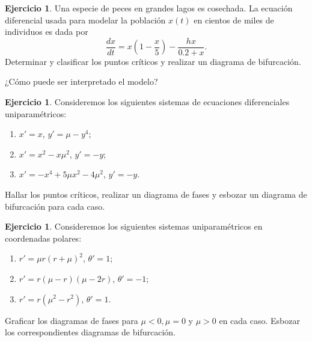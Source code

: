 \documentclass[12pt, a4paper]{amsbook}
\theoremstyle{remark}
\theoremstyle{definition}
\newtheorem{ejer}[teo]{Ejercicio}
\numberwithin{section}{chapter}
\numberwithin{subsection}{section}
\numberwithin{equation}{section}
\numberwithin{figure}{chapter}
\begin{document}
\begin{ejer}
Una especie de peces en grandes lagos es cosechada. La ecuación diferencial usada para modelar la población $x(t)$ en cientos de miles de individuos es dada por
$$
\frac{dx}{dt} = x\left(1 - \frac{x}{5}\right) - \frac{hx}{0.2 + x}.
$$
Determinar y clasificar los puntos críticos y realizar un diagrama de bifurcación.

¿Cómo puede ser interpretado el modelo?
\end{ejer}

\begin{ejer}
Consideremos los siguientes sistemas de ecuaciones diferenciales uniparamétricos:
\begin{enumerate}
\item $x' = x$, $y' = \mu - y^4$;
\item $x' = x^2 - x\mu^2$, $y' = -y$;
\item $x' = -x^4 + 5\mu x^2 - 4\mu^2$, $y' = -y$.
\end{enumerate}
Hallar los puntos críticos, realizar un diagrama de fases y esbozar un diagrama de bifurcación para cada caso.
\end{ejer}

\begin{ejer}
Consideremos los siguientes sistemas uniparamétricos en coordenadas polares:
\begin{enumerate}
\item $r' = \mu r(r + \mu)^2$, $\theta' = 1$;
\item $r' = r(\mu - r)(\mu - 2r)$, $\theta' = -1$;
\item $r' = r(\mu^2 - r^2)$, $\theta' = 1$.
\end{enumerate}
Graficar los diagramas de fases para $\mu < 0, \mu = 0$ y $\mu > 0$ en cada caso. Esbozar los correspondientes diagramas de bifurcación.
\end{ejer}
\end{document}
